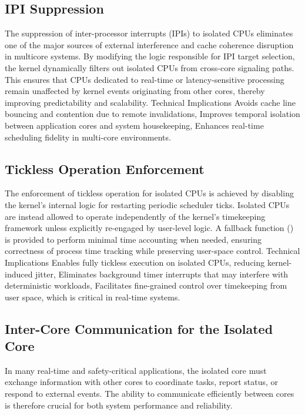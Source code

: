 \documentclass[letterpaper]{article}
\begin{document}
\subsection{IPI Suppression}
The suppression of inter-processor interrupts (IPIs) to isolated CPUs eliminates one of the major
sources of external interference and cache coherence disruption in multicore systems. By
modifying the logic responsible for IPI target selection, the kernel dynamically filters out isolated
CPUs from cross-core signaling paths.
This ensures that CPUs dedicated to real-time or latency-sensitive processing remain unaffected
by kernel events originating from other cores, thereby improving predictability and scalability.
Technical Implications
Avoids cache line bouncing and contention due to remote invalidations,
Improves temporal isolation between application cores and system housekeeping,
Enhances real-time scheduling fidelity in multi-core environments.

\subsection{Tickless Operation Enforcement}
The enforcement of tickless operation for isolated CPUs is achieved by disabling the kernel's
internal logic for restarting periodic scheduler ticks. Isolated CPUs are instead allowed to operate
independently of the kernel's timekeeping framework unless explicitly re-engaged by user-level
logic.
A fallback function () is provided to perform minimal time accounting when needed, ensuring
correctness of process time tracking while preserving user-space control.
Technical Implications
Enables fully tickless execution on isolated CPUs, reducing kernel-induced jitter,
Eliminates background timer interrupts that may interfere with deterministic workloads,
Facilitates fine-grained control over timekeeping from user space, which is critical in real-time
systems.

\subsection{Inter-Core Communication for the Isolated Core}

In many real-time and safety-critical applications, the isolated core must exchange information
with other cores to coordinate tasks, report status, or respond to external events. The ability
to communicate efficiently between cores is therefore crucial for both system performance and reliability. 
\end{document}
